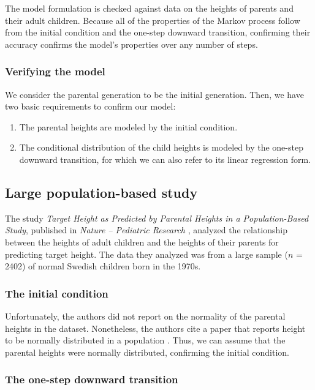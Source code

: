 \documentclass[a4paper,11pt]{article} %
\begin{document}
The model formulation is checked against data on the heights of parents and their adult children. Because all of the properties of the Markov process follow from the initial condition and the one-step downward transition, confirming their accuracy confirms the model's properties over any number of steps.

\subsubsection*{Verifying the model}
We consider the parental generation to be the initial generation. Then, we have two basic requirements to confirm our model:
\begin{enumerate}
\item The parental heights are modeled by the initial condition.
\item The conditional distribution of the child heights is modeled by the one-step downward transition, for which we can also refer to its linear regression form.
\end{enumerate}



\subsection{Large population-based study}

The study \emph{Target Height as Predicted by Parental Heights in a Population-Based Study}, published in \emph{Nature -- Pediatric Research} \cite{luo}, analyzed the relationship between the heights of adult children and the heights of their parents for predicting target height. The data they analyzed was from a large sample ($n$ = 2402) of normal Swedish children born in the 1970s. 


\subsubsection*{The initial condition}
Unfortunately, the authors did not report on the normality of the parental heights in the dataset. Nonetheless, the authors cite a paper that reports height to be normally distributed in a population \cite{preece}. Thus, we can assume that the parental heights were normally distributed, confirming the initial condition.


\subsubsection*{The one-step downward transition}
\end{document}
